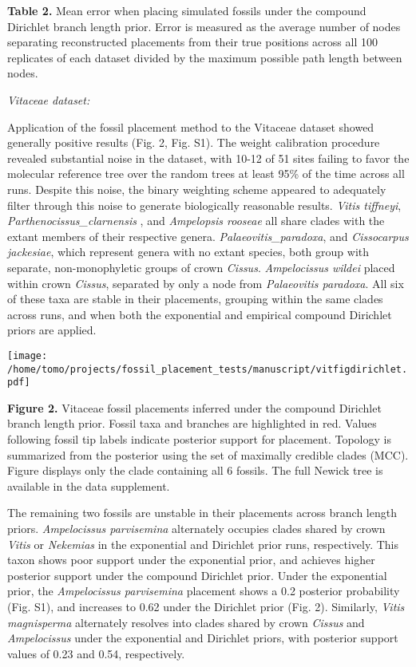 \documentclass[12pt]{article}
\begin{document}
\textbf{Table 2.} Mean error when placing simulated fossils under the compound Dirichlet branch length prior. Error is measured as the average number of nodes
separating reconstructed placements from their true positions across all
100 replicates of each dataset divided by the maximum possible path length between nodes.

\noindent\emph{Vitaceae dataset:}

Application of the fossil placement method to the Vitaceae dataset
showed generally positive results (Fig. 2, Fig. S1). The weight calibration procedure
revealed substantial noise in the dataset, with 10-12 of 51 sites
failing to favor the molecular reference tree over the random trees at
least 95\% of the time across all runs. Despite this noise, the binary
weighting scheme appeared to adequately filter through this noise to
generate biologically reasonable results. \emph{Vitis tiffneyi},
\emph{Parthenocissus\_clarnensis} , and \emph{Ampelopsis rooseae} all
share clades with the extant members of their respective genera.
\emph{Palaeovitis\_paradoxa}, and \emph{Cissocarpus jackesiae}, which
represent genera with no extant species, both group with
separate, non-monophyletic groups of crown \emph{Cissus}.
\emph{Ampelocissus wildei} placed within crown
\emph{Cissus}, separated by only a node from \emph{Palaeovitis
paradoxa}. All six of these taxa are stable in their placements,
grouping within the same clades across runs, and when both the
exponential and empirical compound Dirichlet priors are applied.

\texttt{[image: /home/tomo/projects/fossil\_placement\_tests/manuscript/vitfigdirichlet.pdf]}

\textbf{Figure 2.}  Vitaceae fossil placements inferred
under the compound Dirichlet branch length prior. Fossil taxa and
branches are highlighted in red. Values following fossil tip labels
indicate posterior support for placement. Topology is summarized from
the posterior using the set of maximally credible clades (MCC). 
Figure displays only the clade containing all 6 fossils. The full Newick tree is available in the data supplement.

The remaining two fossils are  unstable in their
placements across branch length priors. \emph{Ampelocissus parvisemina}
alternately occupies  clades shared by crown \emph{Vitis} or
\emph{Nekemias} in the  exponential and Dirichlet prior runs,
respectively. This taxon shows poor support under the exponential prior, and achieves 
higher posterior support under the compound Dirichlet prior.
 Under the exponential prior, the \emph{Ampelocissus parvisemina} placement shows a 0.2
posterior probability (Fig. S1), and increases  to 0.62 under the Dirichlet
prior (Fig. 2). Similarly, \emph{Vitis magnisperma} alternately resolves into
clades shared by crown \emph{Cissus} and \emph{Ampelocissus} under the
exponential and Dirichlet priors, with posterior support values of 0.23
and 0.54, respectively. 
\end{document}
